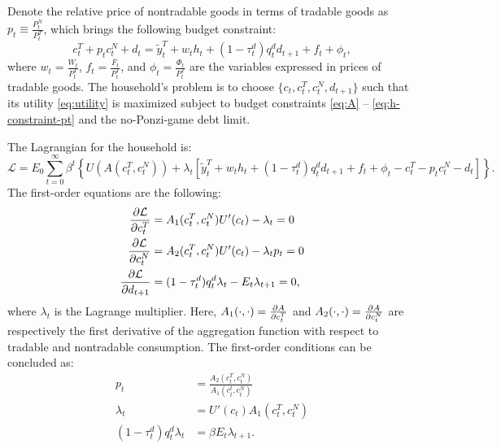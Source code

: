 Denote the relative price of nontradable goods in terms of tradable goods as $p_t \equiv \frac{P^N_t}{P^T_t}$, which brings the following budget constraint:
\begin{equation}
    \label{eq:h-constraint-pt}
    c^T_t + p_t c^N_t +  d_t =
     \tilde{y}^T_t + w_t h_t + (1- \tau^d_t) q^d_t d_{t+1} + f_t + \phi_t,
\end{equation}
where $w_t = \frac{W_t}{P^T_t}$, $f_t = \frac{F_t}{P^T_t}$, and $\phi_t = \frac{\Phi_t}{P^T_t}$ are the variables expressed in prices of tradable goods.
The household's problem is to choose $\{c_t, c_t^T, c_t^N, d_{t+1}\}$ such that its utility \eqref{eq:utility} is maximized subject to budget constraints \eqref{eq:A} -- \eqref{eq:h-constraint-pt} and the no-Ponzi-game debt limit.

The Lagrangian for the household is:
\begin{equation*}
    \mathcal{L} = E_0 \sum_{t=0}^\infty \beta^t \left\{
        U(A(c^T_t, c^N_t)) + \lambda_t \left[
            \tilde{y}^T_t + w_t h_t + (1- \tau^d_t) q^d_t d_{t+1} + f_t + \phi_t -
            c^T_t - p_t c^N_t -  d_t
         \right]
     \right\}.
\end{equation*}
The first-order equations are the following:
\begin{align*}
    \pdv{\mathcal{L}}{c^T_t} &= A_1(c^T_t, c^N_t) U'(c_t) - \lambda_t = 0\\
    \pdv{\mathcal{L}}{c^N_t} &= A_2 (c^T_t, c^N_t) U'(c_t) - \lambda_t p_t = 0 \\
    \pdv{\mathcal{L}}{d_{t+1}} &= (1 - \tau^d_t)q^d_t \lambda_{t} - E_{t} \lambda_{t+1} = 0,
\end{align*}
where $\lambda_t$ is the Lagrange multiplier.
Here,
$A_1(\cdot, \cdot) = \pdv{A}{c^T_t}$ and $A_2(\cdot, \cdot) = \pdv{A}{c^N_t}$ are respectively the first derivative of the aggregation function with respect to tradable and nontradable consumption.
The first-order conditions can be concluded as:
\begin{subequations}
    \begin{align}
        p_t &= \frac{A_2(c_t^T, c_t^N)}{A_1(c_t^t, c_t^N)} \label{eq:FOC-HH-1} \\
        \lambda_t &= U'(c_t)A_1(c_t^T, c_t^N)\\
        (1-\tau_t^d)q_t^d \lambda_t &= \beta E_t \lambda_{t+1}.
    \end{align}
\end{subequations}